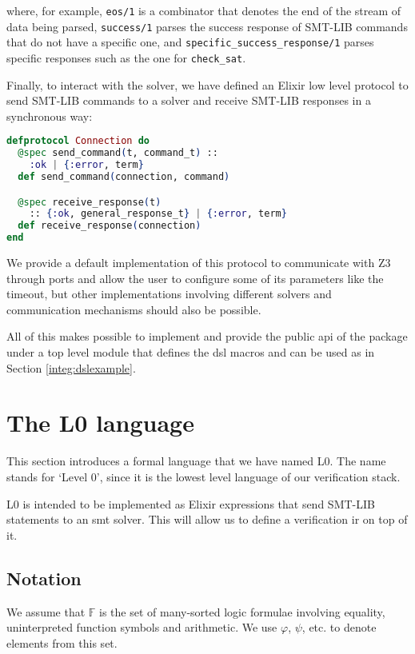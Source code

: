 where, for example, \verb|eos/1| is a combinator that denotes the end of the 
stream of data being parsed, \verb|success/1| parses the success response of
SMT-LIB commands that do not have a specific one, and
\verb|specific_success_response/1| parses specific responses such as the one for
\verb|check_sat|.

Finally, to interact with the solver, we have defined an Elixir low level
protocol to send SMT-LIB commands to a solver and receive SMT-LIB responses in a
synchronous way:

\begin{lstlisting}[language=elixir,numbers=none,frame=none]
defprotocol Connection do
  @spec send_command(t, command_t) :: 
    :ok | {:error, term}
  def send_command(connection, command)

  @spec receive_response(t) 
    :: {:ok, general_response_t} | {:error, term}
  def receive_response(connection)
end
\end{lstlisting}

We provide a default implementation of this protocol to communicate with Z3
through ports and allow the user to configure some of its parameters like the
timeout, but other implementations involving different solvers and communication
mechanisms should also be possible.

All of this makes possible to implement and provide the public \gls{api} of the 
package under a top level module that defines the \gls{dsl} macros and can be
used as in Section \ref{integ:dslexample}.

\section{The L0 language}

This section introduces a formal language that we have named L0. The name stands
for `Level 0', since it is the lowest level language of our verification stack.

L0 is intended to be implemented as Elixir expressions that send SMT-LIB 
statements to an \acrshort{smt} solver. This will allow us to define a
verification \gls{ir} on top of it.

\subsection{Notation}

We assume that $\mathbb{F}$ is the set of many-sorted logic formulae involving
equality, uninterpreted function symbols and arithmetic. We use $\varphi$, 
$\psi$, etc. to denote elements from this set.

